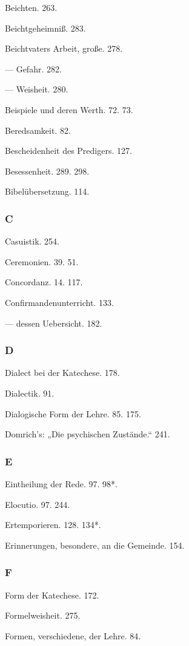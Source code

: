 Beichten. 263.

Beichtgeheimniß. 283.

Beichtvaters Arbeit, große. 278.

— Gefahr. 282.

— Weisheit. 280.

Beispiele und deren Werth. 72. 73.

Beredsamkeit. 82.

Bescheidenheit des Predigers. 127.

Besessenheit. 289. 298.

Bibelübersetzung. 114.

\subsubsection{C}

Casuistik. 254.

Ceremonien. 39. 51.

Concordanz. 14. 117.

Confirmandenunterricht. 133.

— dessen Uebersicht. 182.

\subsubsection{D}

Dialect bei der Katechese. 178.

Dialectik. 91.

Dialogische Form der Lehre. 85. 175.

Domrich's: „Die psychischen Zustände.“ 241.

\subsubsection{E}

Eintheilung der Rede. 97. 98*.

Elocutio. 97. 244.

Ertemporieren. 128. 134*.

Erinnerungen, besondere, an die Gemeinde. 154.

\subsubsection{F}

Form der Katechese. 172.

Formelweisheit. 275.

Formen, verschiedene, der Lehre. 84.

